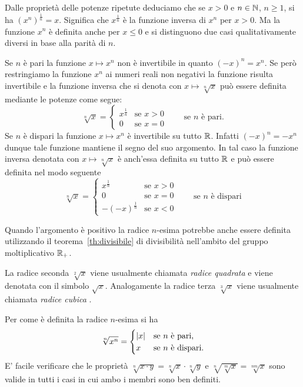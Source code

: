 Dalle proprietà delle potenze ripetute deduciamo che se $x>0$
e $n\in{\mathbb N}$, $n\ge 1$, si ha $(x^n)^\frac 1 n = x$.
Significa che $x^{\frac 1 n}$ è la funzione inversa di $x^n$ per $x>0$.
Ma la funzione $x^n$ è definita anche per $x\le 0$ e si distinguono due 
casi qualitativamente diversi in base alla parità di $n$.

Se $n$ è pari la funzione $x\mapsto x^n$ non è invertibile in quanto 
$(-x)^n = x^n$. 
Se però restringiamo la funzione $x^n$ ai numeri reali non negativi
la funzione risulta invertibile e la funzione inversa 
che si denota con $x\mapsto\sqrt[n]{x}$ 
può essere definita mediante le potenze come segue:
\[
   \sqrt[n]{x} = \begin{cases}
      x^{\frac 1 n} & \text{se $x>0$}\\
      0 & \text{se $x=0$}
   \end{cases} \qquad \text{se $n$ è pari}.
\]
Se $n$ è dispari la funzione $x\mapsto x^n$ è invertibile su tutto 
${\mathbb R}$. 
Infatti $(-x)^n = -x^n$ dunque tale funzione mantiene il segno 
del suo argomento. In tal caso la funzione inversa 
denotata con $x\mapsto \sqrt[n]{x}$
è anch'essa definita su tutto ${\mathbb R}$ e può essere definita 
nel modo seguente
\[
   \sqrt[n]{x} = \begin{cases}
      x^{\frac 1 n} & \text{se $x>0$} \\ 
      0 & \text{se $x=0$}\\
      -(-x)^{\frac 1 n} & \text{se $x<0$}
   \end{cases}
   \qquad\text{se $n$ è dispari}
\]

Quando l'argomento è positivo la radice $n$-esima 
potrebbe anche essere definita utilizzando il teorema~\ref{th:divisibile}
di divisibilità nell'ambito del gruppo moltiplicativo ${\mathbb R}_+$.

La radice seconda $\sqrt[2]{x}$ viene usualmente chiamata 
\emph{radice quadrata}%
%
 e
viene denotata con il simbolo $\sqrt{x}$.
Analogamente la radice terza $\sqrt[3]{x}$ viene usualmente chiamata 
\emph{radice cubica}%
%
.

Per come è definita la radice $n$-esima si ha 
\[
  \sqrt[n]{x^n} = 
  \begin{cases}
     {\left|x\right|} & \text{se $n$ è pari,} \\
     x & \text{se $n$ è dispari.}
  \end{cases}
\]
E' facile verificare che le proprietà 
$\sqrt[n]{x\cdot y} = \sqrt[n]{x} \cdot \sqrt[n]{y}$
e $\sqrt[n]{\sqrt[m]{x}} = \sqrt[nm]{x}$
sono valide in tutti i casi in cui ambo i membri sono ben definiti. 

